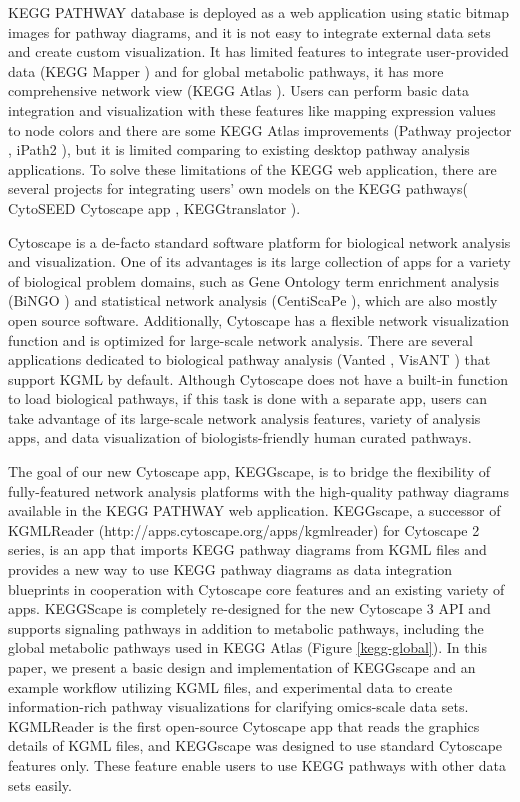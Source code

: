 \documentclass[10pt,a4paper,twocolumn]{article}
\begin{document}
KEGG PATHWAY database is deployed as a web application using static bitmap images for pathway diagrams, and it is not easy to integrate external data sets and create custom visualization.  It has limited features to integrate user-provided data (KEGG Mapper \cite{keggmapper}) and for global metabolic pathways, it has more comprehensive network view (KEGG Atlas \cite{keggatlas}). Users can perform basic data integration and visualization with these features like mapping expression values to node colors and there are some KEGG Atlas improvements (Pathway projector \cite{kono2009pathway}, iPath2 \cite{yamada2011ipath2}), but it is limited comparing to existing desktop pathway analysis applications.  To solve these limitations of the KEGG web application, there are several projects for integrating users’ own models on the KEGG pathways( CytoSEED Cytoscape app \cite{dejongh2012cytoseed}, KEGGtranslator \cite{wrzodek2011keggtranslator}).
\fi

Cytoscape \cite{shannon2003cytoscape} \cite{smoot2011cytoscape} is a de-facto standard software platform for biological network analysis and visualization.  One of its advantages is its large collection of apps for a variety of biological problem domains, such as Gene Ontology term enrichment analysis (BiNGO \cite{maere2005bingo}) and statistical network analysis (CentiScaPe \cite{scardoni2009analyzing}), which are also mostly open source software. Additionally, Cytoscape has a flexible network visualization function and is optimized for large-scale network analysis.  There are several applications dedicated to biological pathway analysis (Vanted \cite{rohn2012vanted}, VisANT \cite{hu2013visant}) that support KGML by default.  Although Cytoscape does not have a built-in function to load biological pathways, if this task is done with a separate app, users can take advantage of its large-scale network analysis features, variety of analysis apps, and data visualization of biologists-friendly human curated pathways.
\newline

The goal of our new Cytoscape app, KEGGscape, is to bridge the flexibility of fully-featured network analysis platforms with the high-quality pathway diagrams available in the KEGG PATHWAY web application.  KEGGscape, a successor of KGMLReader (http://apps.cytoscape.org/apps/kgmlreader) for Cytoscape 2 series, is an app that imports KEGG pathway diagrams from KGML files and provides a new way to use KEGG pathway diagrams as data integration blueprints in cooperation with Cytoscape core features and an existing variety of apps.  KEGGScape is completely re-designed for the new Cytoscape 3 API and supports signaling pathways in addition to metabolic pathways, including the global metabolic pathways used in KEGG Atlas (Figure \ref{kegg-global}). In this paper, we present a basic design and implementation of KEGGscape and an example workflow utilizing KGML files, and experimental data to create information-rich pathway visualizations for clarifying omics-scale data sets. KGMLReader is the first open-source Cytoscape app that reads the graphics details of KGML files, and KEGGscape was designed to use standard Cytoscape features only. These feature enable users to use KEGG pathways with other data sets easily.
\end{document}
